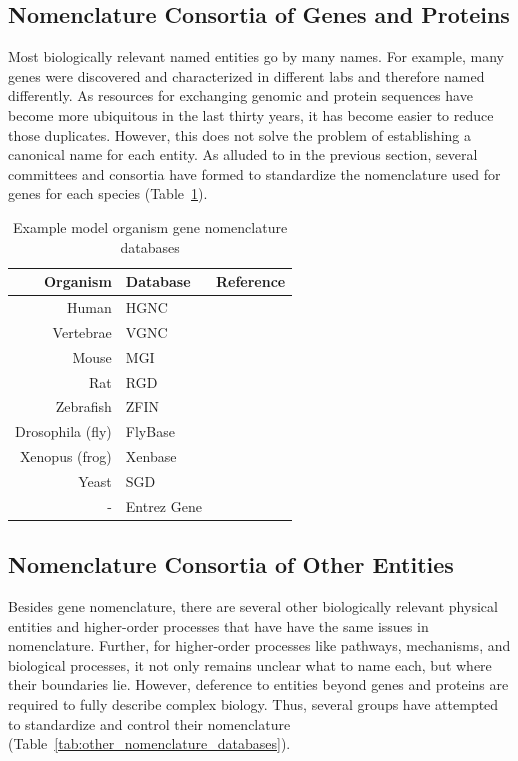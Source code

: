 \subsection{Nomenclature Consortia of Genes and Proteins}

Most biologically relevant named entities go by many names.
For example, many genes were discovered and characterized in different labs and therefore named differently.
As resources for exchanging genomic and protein sequences have become more ubiquitous in the last thirty years, it has become easier to reduce those duplicates.
However, this does not solve the problem of establishing a canonical name for each entity.
As alluded to in the previous section, several committees and consortia have formed to standardize the nomenclature used for genes for each species (Table~\ref{tab:gene_nomenclature_databases}).

\begin{table}
    \centering
    \begin{tabular}{ r l l }
        Organism & Database & Reference \\
        \hline
        Human & \ac{HGNC} &\cite{Yates2017} \\
        Vertebrae & VGNC &\cite{Yates2017} \\
        Mouse & MGI &\cite{Blake2017} \\
        Rat & RGD &\cite{Shimoyama2015} \\
        Zebrafish & ZFIN &\cite{Howe2013}  \\
        Drosophila (fly) & FlyBase &\cite{Thurmond2019}\\
        Xenopus (frog) & Xenbase &\cite{Karimi2018}  \\
        Yeast & SGD &\cite{Cherry2012} \\
        - & Entrez Gene &\cite{Maglott2011}  \\
    \end{tabular}
    \caption{Example model organism gene nomenclature databases}
    \label{tab:gene_nomenclature_databases}
\end{table}

\subsection{Nomenclature Consortia of Other Entities}

Besides gene nomenclature, there are several other biologically relevant physical entities and higher-order processes that have have the same issues in nomenclature.
Further, for higher-order processes like pathways, mechanisms, and biological processes, it not only remains unclear what to name each, but where their boundaries lie.
However, deference to entities beyond genes and proteins are required to fully describe complex biology.
Thus, several groups have attempted to standardize and control their nomenclature (Table~\ref{tab:other_nomenclature_databases}).

